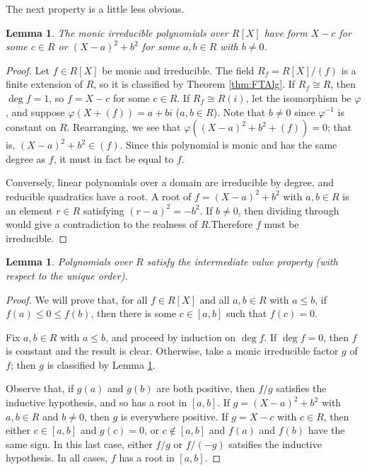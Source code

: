 \documentclass[a4paper]{report}
\newtheorem{lemma}[theorem]{Lemma}
\theoremstyle{definition}
\begin{document}
The next property is a little less obvious.

\begin{lemma}
  \label{lem:irreds_class}
  The monic irreducible polynomials over $R[X]$ have form $X-c$ for some $c\in R$ or $(X-a)^2+b^2$ for some $a,b\in R$ with $b\neq0$.
\end{lemma}
\begin{proof}
  Let $f\in R[X]$ be monic and irreducible. The field $R_f=R[X]/(f)$ is a finite extension of $R$, so it is classified by Theorem \ref{thm:FTAlg}. If $R_f\cong R$, then $\deg f=1$, so $f=X-c$ for some $c\in R$. If $R_f\cong R(i)$, let the isomorphism be $\varphi$, and suppose $\varphi(X+(f))=a+bi$ ($a,b\in R$). Note that $b\neq0$ since $\varphi^{-1}$ is constant on $R$. Rearranging, we see that $\varphi((X-a)^2+b^2+(f))=0$; that is, $(X-a)^2+b^2\in(f)$. Since this polynomial is monic and has the same degree as $f$, it must in fact be equal to $f$.

  Conversely, linear polynomials over a domain are irreducible by degree, and reducible quadratics have a root. A root of $f=(X-a)^2+b^2$ with $a,b\in R$ is an element $r\in R$ satisfying $(r-a)^2=-b^2$. If $b\neq0$, then dividing through would give a contradiction to the realness of $R$.Therefore $f$ must be irreducible.
\end{proof}

\begin{lemma}
  \label{lem:IVP_poly}
  Polynomials over $R$ satisfy the intermediate value property (with respect to the unique order).
\end{lemma}
\begin{proof}
  We will prove that, for all $f\in R[X]$ and all $a,b\in R$ with $a\leq b$, if $f(a)\leq 0\leq f(b)$, then there is some $c\in[a,b]$ such that $f(c)=0$.

  Fix $a,b\in R$ with $a\leq b$, and proceed by induction on $\deg f$. If $\deg f=0$, then $f$ is constant and the result is clear. Otherwise, take a monic irreducible factor $g$ of $f$; then $g$ is classified by Lemma \ref{lem:irreds_class}.

  Observe that, if $g(a)$ and $g(b)$ are both positive, then $f/g$ satisfies the inductive hypothesis, and so has a root in $[a,b]$. If $g=(X-a)^2+b^2$ with $a,b\in R$ and $b\neq0$, then $g$ is everywhere positive. If $g=X-c$ with $c\in R$, then either $c\in[a,b]$ and $g(c)=0$, or $c\notin[a,b]$ and $f(a)$ and $f(b)$ have the same sign. In this last case, either $f/g$ or $f/(-g)$ satsifies the inductive hypothesis. In all cases, $f$ has a root in $[a,b]$.
\end{proof}
\end{document}
